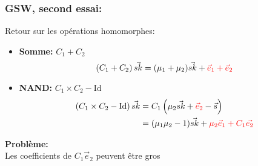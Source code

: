 \documentclass[10pt,xcolor={usenames,dvipsnames}]{beamer}
\begin{document}


\begin{frame} 
\frametitle{GSW, second essai:}
Retour sur les opérations homomorphes:
\begin{itemize}
\item \textbf{Somme:} $C_1 + C_2\quad$
\[\left(C_1 + C_2\right) \vec{sk} = (\mu_1 + \mu_2) \vec{sk} + {\color{red}\vec{e}_1 + \vec{e}_2}\]
\item \textbf{NAND:} $C_1 \times C_2 - \text{Id}$
\begin{align*}
\left(C_1 \times C_2 - \text{Id}\right) \vec{sk} &= C_1\left(\mu_2\vec{sk} + {\color{red}\vec{e}_2} - \vec{s}\right) \\
&= (\mu_1 \mu_2 - 1) \vec{sk} + {\color{red}\mu_2 \vec{e}_1 + C_1 \vec{e_2}}
\end{align*}
\end{itemize}

\textbf{Problème:} \\
Les coefficients de $C_1 \vec{e}_2$ peuvent être gros

\end{frame} 

  
\end{document}
